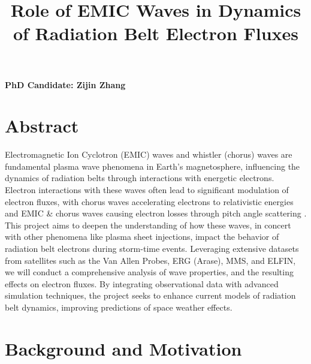 \documentclass[
  letterpaper,
  DIV=11,
  numbers=noendperiod]{scrartcl}
\title{Role of EMIC Waves in Dynamics of Radiation Belt Electron Fluxes}
\author{}
\date{}
\begin{document}
\maketitle

\vspace{-20truemm}

\textbf{PhD Candidate: Zijin Zhang}

\section{Abstract}\label{abstract}

Electromagnetic Ion Cyclotron (EMIC) waves and whistler (chorus) waves are fundamental plasma wave phenomena in Earth's magnetosphere, influencing the dynamics of radiation belts through interactions with energetic electrons. Electron interactions with these waves often lead to significant modulation of electron fluxes, with chorus waves accelerating electrons to relativistic energies \citep{miyoshiRebuildingProcessOuter2003} and EMIC \& chorus waves causing electron losses through pitch angle scattering \citep{summersRelativisticElectronPitchangle2003, summersTimescalesRadiationBelt2007}. This project aims to deepen the understanding of how these waves, in concert with other phenomena like plasma sheet injections, impact the behavior of radiation belt electrons during storm-time events. Leveraging extensive datasets from satellites such as the Van Allen Probes, ERG (Arase), MMS, and ELFIN, we will conduct a comprehensive analysis of wave properties, and the resulting effects on electron fluxes. By integrating observational data with advanced simulation techniques, the project seeks to enhance current models of radiation belt dynamics, improving predictions of space weather effects.

\section{Background and Motivation}\label{background-and-motivation}
\end{document}
